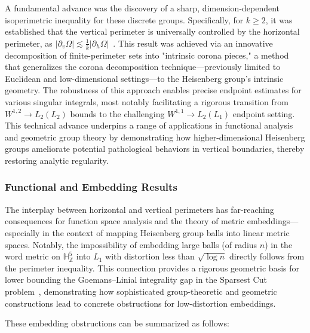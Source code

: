 A fundamental advance was the discovery of a sharp, dimension-dependent isoperimetric inequality for these discrete groups. Specifically, for $k \geq 2$, it was established that the vertical perimeter is universally controlled by the horizontal perimeter, as $|\partial_{v}\Omega| \lesssim \frac{1}{k} |\partial_{h}\Omega|$~\cite{ref108}. This result was achieved via an innovative decomposition of finite-perimeter sets into "intrinsic corona pieces," a method that generalizes the corona decomposition technique—previously limited to Euclidean and low-dimensional settings—to the Heisenberg group's intrinsic geometry. The robustness of this approach enables precise endpoint estimates for various singular integrals, most notably facilitating a rigorous transition from $W^{1,2} \to L_2(L_2)$ bounds to the challenging $W^{1,1} \to L_2(L_1)$ endpoint setting. This technical advance underpins a range of applications in functional analysis and geometric group theory by demonstrating how higher-dimensional Heisenberg groups ameliorate potential pathological behaviors in vertical boundaries, thereby restoring analytic regularity.

\subsubsection{Functional and Embedding Results}

The interplay between horizontal and vertical perimeters has far-reaching consequences for function space analysis and the theory of metric embeddings—especially in the context of mapping Heisenberg group balls into linear metric spaces. Notably, the impossibility of embedding large balls (of radius $n$) in the word metric on $\mathbb{H}^5_{\mathbb{Z}}$ into $L_1$ with distortion less than $\sqrt{\log n}$ directly follows from the perimeter inequality. This connection provides a rigorous geometric basis for lower bounding the Goemans–Linial integrality gap in the Sparsest Cut problem~\cite{ref108}, demonstrating how sophisticated group-theoretic and geometric constructions lead to concrete obstructions for low-distortion embeddings.

These embedding obstructions can be summarized as follows:

